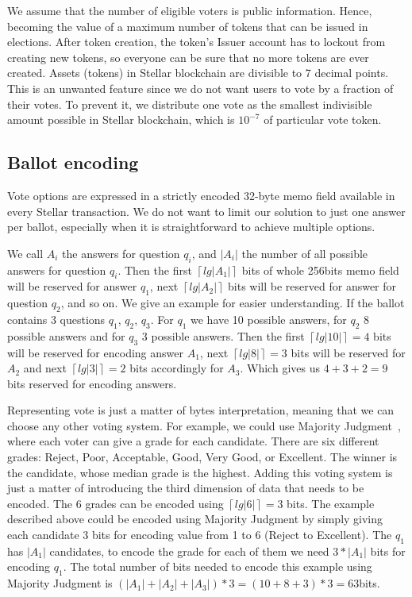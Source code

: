 \documentclass[applsci,article,submit,moreauthors,pdftex]{Definitions/mdpi}
\newcommand{\ceil}[1]{\left\lceil #1 \right\rceil}
\begin{document}
We assume that the number of eligible voters is public information. 
Hence, becoming the value of a maximum number of tokens that can be issued in elections. 
After token creation, the token's Issuer account has to lockout from creating new tokens, so everyone can be sure that no more tokens are ever created.
Assets (tokens) in Stellar blockchain are divisible to 7 decimal points. 
This is an unwanted feature since we do not want users to vote by a fraction of their votes.
To prevent it, we distribute one vote as the smallest indivisible amount possible in Stellar blockchain, which is $10^{-7}$ of particular vote token.


\subsection{Ballot encoding}
Vote options are expressed in a strictly encoded 32-byte memo field available in every Stellar transaction. We do not want to limit our solution to just one answer per ballot, especially when it is straightforward to achieve multiple options. 

We call $A_i$ the answers for question $q_i$, and $|A_i|$ the number of all possible answers for question $q_i$. Then the first $\ceil{lg{|A_1|}}$ bits of whole 256bits memo field will be reserved for answer $q_1$, next $\ceil{lg{|A_2|}}$ bits will be reserved for answer for question $q_2$, and so on. We give an example for easier understanding. If the ballot contains 3 questions $q_1$, $q_2$, $q_3$. For $q_1$ we have 10 possible answers, for $q_2$ 8 possible answers and for $q_3$ 3 possible answers. Then the first $\ceil{lg{|10|}} = 4$ bits will be reserved for encoding answer $A_1$, next $\ceil{lg{|8|}} = 3$ bits will be reserved for $A_2$ and next $\ceil{lg{|3|}} = 2$ bits accordingly for $A_3$. Which gives us $4 + 3 + 2 = 9$ bits reserved for encoding answers. 

Representing vote is just a matter of bytes interpretation, meaning that we can choose any other voting system. For example, we could use Majority Judgment~\cite{balinski2011majority}, where each voter can give a grade for each candidate. There are six different grades: Reject, Poor, Acceptable, Good, Very Good, or Excellent. The winner is the candidate, whose median grade is the highest. Adding this voting system is just a matter of introducing the third dimension of data that needs to be encoded. The 6 grades can be encoded using $\ceil{lg{|6|}} = 3$ bits. The example described above could be encoded using Majority Judgment by simply giving each candidate 3 bits for encoding value from 1 to 6 (Reject to Excellent). The $q_1$ has $|A_1|$ candidates, to encode the grade for each of them we need $3 * |A_1|$ bits for encoding $q_1$. The total number of bits needed to encode this example using Majority Judgment is $(|A_1| + |A_2| + |A_3|) * 3 = (10 + 8 + 3) * 3 = 63$bits. 
\end{document}
